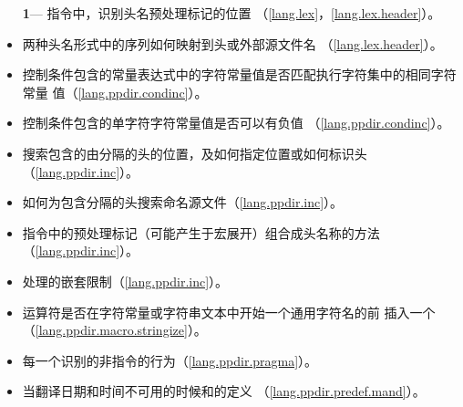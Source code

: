 \begin{itemize} %
  \item[\textbf{1}\hspace{5pt}---]{指令中，识别头名预处理标记的位置
    （\ref{lang.lex}，\ref{lang.lex.header}）。}
  \item{两种头名形式中的序列如何映射到头或外部源文件名
    （\ref{lang.lex.header}）。}
  \item{控制条件包含的常量表达式中的字符常量值是否匹配执行字符集中的相同字符常量
    值（\ref{lang.ppdir.condinc}）。}
  \item{控制条件包含的单字符字符常量值是否可以有负值
    （\ref{lang.ppdir.condinc}）。}
  \item{搜索包含的由\tm{< >}分隔的头的位置，及如何指定位置或如何标识头
    （\ref{lang.ppdir.inc}）。}
  \item{如何为包含\tm{\dq \dq}分隔的头搜索命名源文件（\ref{lang.ppdir.inc}）。}
  \item{指令中的预处理标记（可能产生于宏展开）组合成头名称的方法
    （\ref{lang.ppdir.inc}）。}
  \item{处理的嵌套限制（\ref{lang.ppdir.inc}）。}
  \item{\tm{\#}运算符是否在字符常量或字符串文本中开始一个通用字符名的\tm{\bs}前
    插入一个\tm{\bs}（\ref{lang.ppdir.macro.stringize}）。}
  \item{每一个识别的非指令的行为（\ref{lang.ppdir.pragma}）。}
  \item{当翻译日期和时间不可用的时候和的定义
    （\ref{lang.ppdir.predef.mand}）。}
\end{itemize}

